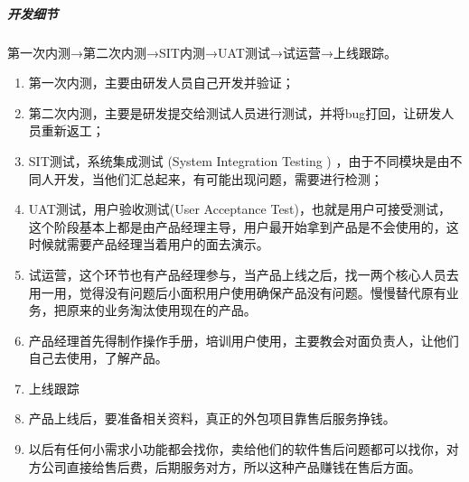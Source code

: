 \documentclass[letterpaper,11pt,english]{sphinxmanual}
\begin{document}
\subparagraph{开发细节}
\label{\detokenize{chapter_knowledge/project_manage:id6}}
第一次内测→第二次内测→SIT内测→UAT测试→试运营→上线跟踪。
%
\begin{footnote}[558]\sphinxAtStartFootnote
{}
%
\end{footnote}
\begin{enumerate}
%
\item {} 
第一次内测，主要由研发人员自己开发并验证；

\item {} 
第二次内测，主要是研发提交给测试人员进行测试，并将bug打回，让研发人员重新返工；

\item {} 
SIT测试，系统集成测试 (System Integration Testing )
，由于不同模块是由不同人开发，当他们汇总起来，有可能出现问题，需要进行检测；

\item {} 
UAT测试，用户验收测试(User Acceptance
Test)，也就是用户可接受测试，这个阶段基本上都是由产品经理主导，用户最开始拿到产品是不会使用的，这时候就需要产品经理当着用户的面去演示。

\item {} 
试运营，这个环节也有产品经理参与，当产品上线之后，找一两个核心人员去用一用，觉得没有问题后小面积用户使用确保产品没有问题。慢慢替代原有业务，把原来的业务淘汰使用现在的产品。

\item {} 
产品经理首先得制作操作手册，培训用户使用，主要教会对面负责人，让他们自己去使用，了解产品。

\item {} 
上线跟踪

\item {} 
产品上线后，要准备相关资料，真正的外包项目靠售后服务挣钱。

\item {} 
以后有任何小需求小功能都会找你，卖给他们的软件售后问题都可以找你，对方公司直接给售后费，后期服务对方，所以这种产品赚钱在售后方面。

\end{enumerate}
\end{document}
